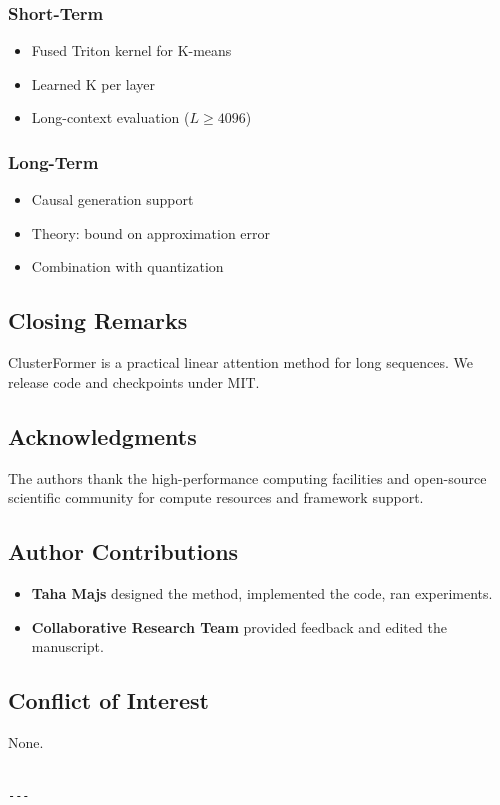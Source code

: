 \subsubsection{Short-Term}
\begin{itemize}
\item Fused Triton kernel for K-means
\item Learned K per layer
\item Long-context evaluation ($L \geq 4096$)

\end{itemize}
\subsubsection{Long-Term}
\begin{itemize}
\item Causal generation support
\item Theory: bound on approximation error
\item Combination with quantization

\end{itemize}
\subsection{Closing Remarks}

ClusterFormer is a practical linear attention method for long sequences. 
We release code and checkpoints under MIT.

\subsection{Acknowledgments}

The authors thank the high-performance computing facilities and open-source scientific community for compute resources and framework support.

\subsection{Author Contributions}

\begin{itemize}
\item \textbf{Taha Majs} designed the method, implemented the code, ran experiments.
\item \textbf{Collaborative Research Team} provided feedback and edited the manuscript.

\end{itemize}
\subsection{Conflict of Interest}

None.
\begin{lstlisting}

---
\end{lstlisting}